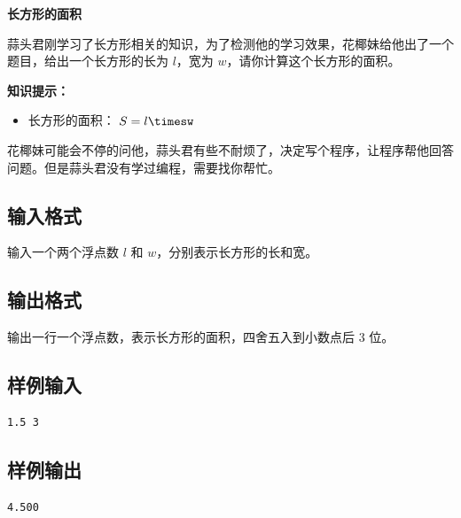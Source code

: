 \documentclass{article}
\newcommand{\problemname}[1]{\begin{center}\Large\bfseries #1\end{center}}
\begin{document}
\problemname{长方形的面积}

蒜头君刚学习了长方形相关的知识，为了检测他的学习效果，花椰妹给他出了一个题目，给出一个长方形的长为 $l$，宽为 $w$，请你计算这个长方形的面积。

\textbf{知识提示：}

\begin{itemize}
  \item 长方形的面积： $S=l\timesw$

\end{itemize}
花椰妹可能会不停的问他，蒜头君有些不耐烦了，决定写个程序，让程序帮他回答问题。但是蒜头君没有学过编程，需要找你帮忙。

\subsection*{输入格式}
输入一个两个浮点数 $l$ 和 $w$，分别表示长方形的长和宽。

\subsection*{输出格式}
输出一行一个浮点数，表示长方形的面积，四舍五入到小数点后 $3$ 位。

\subsection*{样例输入}
\begin{verbatim}
1.5 3
\end{verbatim}

\subsection*{样例输出}
\begin{verbatim}
4.500
\end{verbatim}
\end{document}
